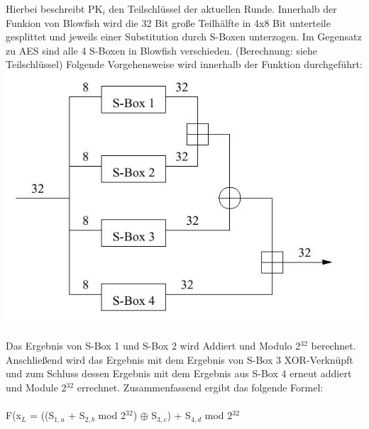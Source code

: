 \documentclass[10pt, a4paper,headsepline]{scrreprt}
\begin{document}
\begin{minipage}[t]{10cm}

Hierbei beschreibt PK$_{i}$ den Teilschlüssel der aktuellen Runde. Innerhalb der Funkion von Blowfish wird die 32 Bit große Teilhälfte in 4x8 Bit unterteile gesplittet und jeweils einer Substitution durch S-Boxen unterzogen. Im Gegensatz zu AES sind alle 4 S-Boxen in Blowfish verschieden. (Berechnung: siehe Teilschlüssel) Folgende Vorgehensweise wird innerhalb der Funktion durchgeführt: \\ 
\includegraphics[scale=0.25]{blowfish_2.JPG}  %
\label{fig:Funktion Blowfish} 
\hfill

Das Ergebnis von S-Box 1 und S-Box 2 wird Addiert und Modulo 2$^{32}$ berechnet. Anschließend wird das Ergebnis mit dem Ergebnis von S-Box 3 XOR-Verknüpft und zum Schluss dessen Ergebnis mit dem Ergebnis aus S-Box 4 erneut addiert und Module 2$^{32}$ errechnet. Zusammenfassend ergibt das folgende Formel: \\ \\
F(x$_{L}$ = ((S$_{1,a}$ + S$_{2,b}$ mod 2$^{32}$) $\oplus$ S$_{3,c}$) + S$_{4,d}$ mod 2$^{32}$ \\ \\
\end{minipage}
\end{document}
